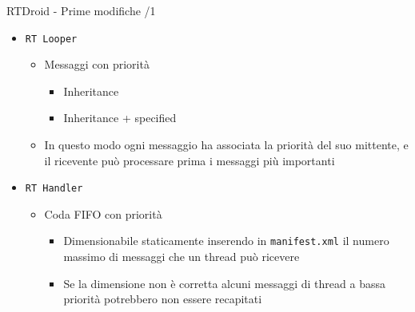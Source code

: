 \begin{frame}{RTDroid - Prime modifiche /1}
	\begin{itemize}
		\item \texttt{RT Looper}
		\begin{itemize}
			\item Messaggi con priorità
			\begin{itemize}
				\item Inheritance
				\item Inheritance + specified
			\end{itemize}
		\item In questo modo ogni messaggio ha associata la priorità del suo mittente, e il ricevente può processare prima i messaggi più importanti
		\end{itemize}
		\item \texttt{RT Handler}
		\begin{itemize}
			\item Coda FIFO con priorità
			\begin{itemize}
				\item Dimensionabile staticamente inserendo in \texttt{manifest.xml} il numero massimo di messaggi che un thread può ricevere
				\item Se la dimensione non è corretta alcuni messaggi di thread a bassa priorità potrebbero non essere recapitati
			\end{itemize}
		\end{itemize}
	\end{itemize}
\end{frame}
